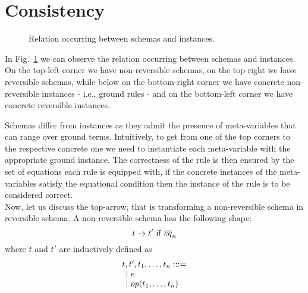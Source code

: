 \documentclass{article}[12pt,a4paper]
\theoremstyle{definition}
\begin{document}
\section{Consistency}

\begin{figure}
  \centering
  \caption{ Relation occurring between schemas and instances. }
  \label{fig:square}
\end{figure}

In Fig.~\ref{fig:square} we can observe the relation occurring between schemas
and instances. On the top-left corner we have non-reversible schemas, on the
top-right we have reversible schemas, while below on the
bottom-right corner we have concrete non-reversible instances - i.e., ground
rules - and on the bottom-left corner we have concrete reversible instances.

Schemas differ from instances as they admit the presence of meta-variables that
can range over ground terms. Intuitively, to get from one of the top corners to
the respective concrete one we need to instantiate each meta-variable with
the appropriate ground instance. The correctness of the rule is then ensured by
the set of equations each rule is equipped with, if the concrete instances of
the meta-variables satisfy the equational condition then the instance of the
rule is to be considered correct.\\

Now, let us discuss the top-arrow, that is transforming a non-reversible schema in reversible
schema. A non-reversible schema has the following shape:
\[t \rightarrow t'~\mathsf{if}~\overline{eq}_n\]
where $t$ and $t'$ are inductively defined as
\[
  \begin{array}{l}
    t,t',t_1,\ldots,t_n: ::=\\
    \hspace{1ex}|~e\\
    \hspace{1ex}|~op(t_1,\ldots,t_n)\\
  \end{array}
\]
\end{document}
